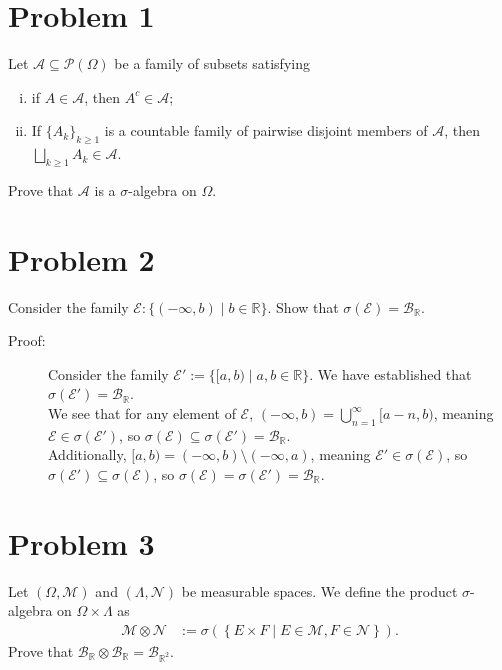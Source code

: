 \documentclass[10pt]{extarticle}
\title{}
\author{}
\date{}
\newcommand{\R}{\mathbb{R}}
\begin{document}
  \section{Problem 1}%
  Let $\mathcal{A}\subseteq \mathcal{P}(\Omega)$ be a family of subsets satisfying
  \begin{enumerate}[(i)]
    \item if $A\in \mathcal{A}$, then $A^{c}\in \mathcal{A}$;
    \item If $\{A_k\}_{k\geq 1}$ is a countable family of pairwise disjoint members of $\mathcal{A}$, then $\bigsqcup_{k\geq 1}A_k \in \mathcal{A}$.
  \end{enumerate}
  Prove that $\mathcal{A}$ is a $\sigma$-algebra on $\Omega$.
  \section{Problem 2}%
  Consider the family $\mathcal{E}: \{(-\infty,b)\mid b\in\R\}$. Show that $\sigma(\mathcal{E}) = \mathcal{B}_{\R}$.
  \begin{description}
    \item[Proof:] Consider the family $\mathcal{E}' := \{[a,b)\mid a,b\in\R\}$. We have established that $\sigma(\mathcal{E}') = \mathcal{B}_{\R}$.\\

      We see that for any element of $\mathcal{E}$, $(-\infty,b) = \bigcup_{n=1}^{\infty}[a-n,b)$, meaning $\mathcal{E}\in \sigma(\mathcal{E}')$, so $\sigma\left(\mathcal{E}\right)\subseteq \sigma(\mathcal{E}') = \mathcal{B}_{\R}$.\\

      Additionally, $[a,b) = (-\infty,b)\setminus (-\infty,a)$, meaning $\mathcal{E}' \in \sigma(\mathcal{E})$, so $\sigma(\mathcal{E}')\subseteq \sigma(\mathcal{E})$, so $\sigma\left(\mathcal{E}\right) = \sigma(\mathcal{E}') = \mathcal{B}_{\R}$.
  \end{description}
  \section{Problem 3}%
  Let $(\Omega,\mathcal{M})$ and $(\Lambda,\mathcal{N})$ be measurable spaces. We define the product $\sigma$-algebra on $\Omega \times \Lambda$ as
  \begin{align*}
    \mathcal{M}\otimes \mathcal{N} &:= \sigma\left(\left\{E\times F\mid E\in\mathcal{M},F\in\mathcal{N}\right\}\right).
  \end{align*}
  Prove that $\mathcal{B}_{\R}\otimes \mathcal{B}_{\R} = \mathcal{B}_{\R^2}$.
\end{document}

